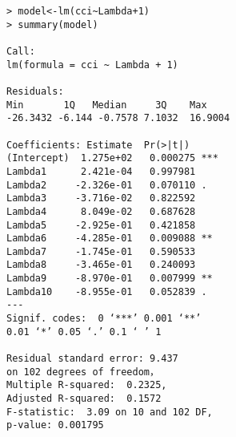 \documentclass[10pt,journal,compsoc]{IEEEtran}
\begin{document}
\begin{lstlisting}
> model<-lm(cci~Lambda+1)
> summary(model)

Call:
lm(formula = cci ~ Lambda + 1)

Residuals:
Min       1Q   Median     3Q    Max 
-26.3432 -6.144 -0.7578 7.1032  16.9004 

Coefficients: Estimate  Pr(>|t|)    
(Intercept)  1.275e+02   0.000275 ***
Lambda1      2.421e-04   0.997981    
Lambda2     -2.326e-01   0.070110 .  
Lambda3     -3.716e-02   0.822592    
Lambda4      8.049e-02   0.687628    
Lambda5     -2.925e-01   0.421858    
Lambda6     -4.285e-01   0.009088 ** 
Lambda7     -1.745e-01   0.590533    
Lambda8     -3.465e-01   0.240093    
Lambda9     -8.970e-01   0.007999 ** 
Lambda10    -8.955e-01   0.052839 .  
---
Signif. codes:  0 ‘***’ 0.001 ‘**’ 
0.01 ‘*’ 0.05 ‘.’ 0.1 ‘ ’ 1

Residual standard error: 9.437 
on 102 degrees of freedom，
Multiple R-squared:  0.2325,
Adjusted R-squared:  0.1572 
F-statistic:  3.09 on 10 and 102 DF,  
p-value: 0.001795
\end{lstlisting}


%
%
%





% 



\end{document}
